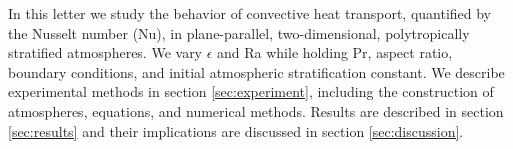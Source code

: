 \documentclass[aps, prl, twocolumn, nofootinbib, groupedaddress, amsfonts, amssymb, amsmath]{revtex4-1}
\newcommand{\nrho}{\ensuremath{n_{\rho}}}
\begin{document}

In this letter we study the behavior of convective heat transport, 
quantified by the Nusselt number (Nu), in plane-parallel, 
two-dimensional, polytropically stratified atmospheres.  
We vary $\epsilon$ and Ra while holding Pr, aspect ratio, boundary conditions,
and initial atmospheric stratification
constant.  We describe experimental methods in section 
\ref{sec:experiment}, including the construction of atmospheres, 
equations, and numerical methods.  
Results are described in section \ref{sec:results} 
and their implications are discussed
in section \ref{sec:discussion}.
\end{document}
